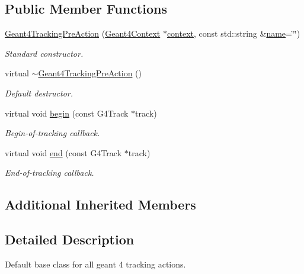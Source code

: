 \subsection*{Public Member Functions}
\begin{DoxyCompactItemize}
\item 
\hyperlink{class_d_d4hep_1_1_simulation_1_1_geant4_tracking_pre_action_a7727fa75c8c1ee2a81b105d4e8aa29a5}{Geant4\+Tracking\+Pre\+Action} (\hyperlink{class_d_d4hep_1_1_simulation_1_1_geant4_context}{Geant4\+Context} $\ast$\hyperlink{class_d_d4hep_1_1_simulation_1_1_geant4_action_aa9d87f0ec2a72b7fc2591b18f98d75cf}{context}, const std\+::string \&\hyperlink{class_d_d4hep_1_1_simulation_1_1_geant4_action_af374e70b014d16afb81dd9d77cc3894b}{name}=\char`\"{}\char`\"{})
\begin{DoxyCompactList}\small\item\em Standard constructor. \end{DoxyCompactList}\item 
virtual \hyperlink{class_d_d4hep_1_1_simulation_1_1_geant4_tracking_pre_action_a47e7a397ae402a4f4d7ec9cfdb0bb143}{$\sim$\+Geant4\+Tracking\+Pre\+Action} ()
\begin{DoxyCompactList}\small\item\em Default destructor. \end{DoxyCompactList}\item 
virtual void \hyperlink{class_d_d4hep_1_1_simulation_1_1_geant4_tracking_pre_action_a1a4535994e5225ef10c47164a21deb92}{begin} (const G4\+Track $\ast$track)
\begin{DoxyCompactList}\small\item\em Begin-\/of-\/tracking callback. \end{DoxyCompactList}\item 
virtual void \hyperlink{class_d_d4hep_1_1_simulation_1_1_geant4_tracking_pre_action_a372b3efd2f2ac8f2c75bb435fd286ac3}{end} (const G4\+Track $\ast$track)
\begin{DoxyCompactList}\small\item\em End-\/of-\/tracking callback. \end{DoxyCompactList}\end{DoxyCompactItemize}
\subsection*{Additional Inherited Members}


\subsection{Detailed Description}
Default base class for all geant 4 tracking actions. 

